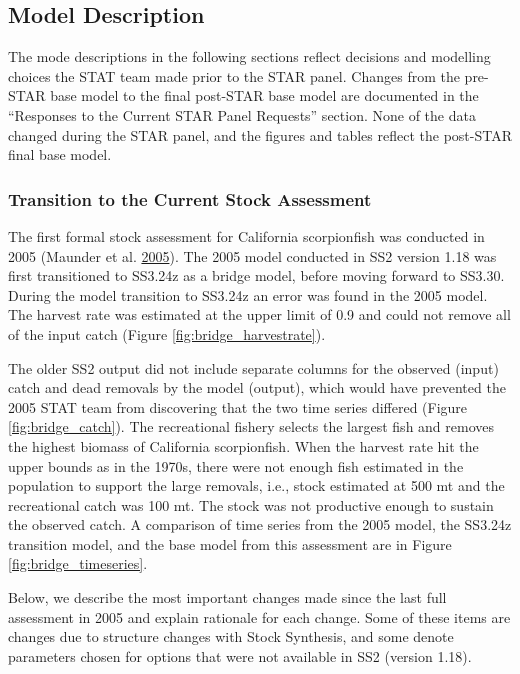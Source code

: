 \documentclass[12pt,]{article}
\begin{document}
\subsection{Model Description}\label{model-description}

The mode descriptions in the following sections reflect decisions and
modelling choices the STAT team made prior to the STAR panel. Changes
from the pre-STAR base model to the final post-STAR base model are
documented in the ``Responses to the Current STAR Panel Requests''
section. None of the data changed during the STAR panel, and the figures
and tables reflect the post-STAR final base model.

\subsubsection{Transition to the Current Stock
Assessment}\label{transition-to-the-current-stock-assessment}

The first formal stock assessment for California scorpionfish was
conducted in 2005 (Maunder et al.
\protect\hyperlink{ref-Maunder2005}{2005}). The 2005 model conducted in
SS2 version 1.18 was first transitioned to SS3.24z as a bridge model,
before moving forward to SS3.30. During the model transition to SS3.24z
an error was found in the 2005 model. The harvest rate was estimated at
the upper limit of 0.9 and could not remove all of the input catch
(Figure \ref{fig:bridge_harvestrate}).

The older SS2 output did not include separate columns for the observed
(input) catch and dead removals by the model (output), which would have
prevented the 2005 STAT team from discovering that the two time series
differed (Figure \ref{fig:bridge_catch}). The recreational fishery
selects the largest fish and removes the highest biomass of California
scorpionfish. When the harvest rate hit the upper bounds as in the
1970s, there were not enough fish estimated in the population to support
the large removals, i.e., stock estimated at 500 mt and the recreational
catch was 100 mt. The stock was not productive enough to sustain the
observed catch. A comparison of time series from the 2005 model, the
SS3.24z transition model, and the base model from this assessment are in
Figure \ref{fig:bridge_timeseries}.

Below, we describe the most important changes made since the last full
assessment in 2005 and explain rationale for each change. Some of these
items are changes due to structure changes with Stock Synthesis, and
some denote parameters chosen for options that were not available in SS2
(version 1.18).
\end{document}
